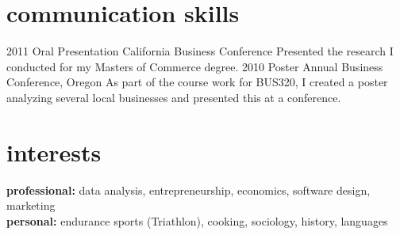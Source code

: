 \documentclass[]{friggeri-cv} %
\begin{document}
\section{communication skills}

\begin{entrylist}
\entry
{2011}
{Oral Presentation}
{California Business Conference}
{Presented the research I conducted for my Masters of Commerce degree.}
\entry
{2010}
{Poster}
{Annual Business Conference, Oregon}
{As part of the course work for BUS320, I created a poster analyzing several local businesses and presented this at a conference.}
\end{entrylist}


\section{interests}

\textbf{professional:} data analysis, entrepreneurship, economics, software design, marketing \\
\textbf{personal:} endurance sports (Triathlon), cooking, sociology, history, languages





\end{document}
